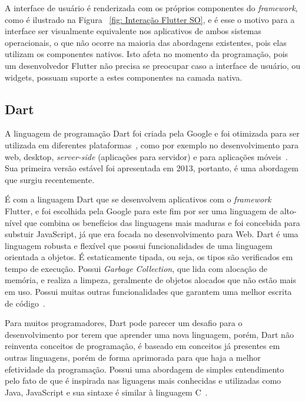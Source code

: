 A interface de usuário é renderizada com os próprios componentes do \textit{framework}, como é ilustrado na Figura ~\ref{fig: Interação Flutter SO}, e é esse o motivo para a interface ser visualmente equivalente nos aplicativos de ambos sistemas operacionais, o que não ocorre na maioria das abordagens existentes, pois elas utilizam os componentes nativos.
Isto afeta no momento da programação, pois um desenvolvedor Flutter não precisa se preocupar caso a interface de usuário, ou widgets, possuam suporte a estes componentes na camada nativa\cite{zammetti2019practical}.

\subsection{Dart}\label{subsec:dart}

A linguagem de programação Dart foi criada pela Google e foi otimizada para ser utilizada em diferentes plataformas~\cite{clow2019flutter}, como por exemplo no desenvolvimento para web, desktop, \textit{server-side} (aplicações para servidor) e para aplicações móveis~\cite{biessek2019dart}.
Sua primeira versão estável foi apresentada em 2013, portanto, é uma abordagem que surgiu recentemente.

É com a linguagem Dart que se desenvolvem aplicativos com o \textit{framework} Flutter, e foi escolhida pela Google para este fim por ser uma linguagem de alto-nível que combina os benefícios das linguagens mais maduras e foi concebida para substuir JavaScript, já que era focada no desenvolvimento para Web.
Dart é uma linguagem robusta e flexível que possui funcionalidades de uma linguagem orientada a objetos.
É estaticamente tipada, ou seja, os tipos são verificados em tempo de execução.
Possui \textit{Garbage Collection}, que lida com alocação de memória, e realiza a limpeza, geralmente de objetos alocados que não estão mais em uso.
Possui muitas outras funcionalidades que garantem uma melhor escrita de código~\cite{biessek2019dart}.

Para muitos programadores, Dart pode parecer um desafio para o desenvolvimento por terem que aprender uma nova linguagem, porém, Dart não reinventa conceitos de programação, é baseado em conceitos já presentes em outras linguagens, porém de forma aprimorada para que haja a melhor efetividade da programação.
Possui uma abordagem de simples entendimento pelo fato de que é inspirada nas liguagens mais conhecidas e utilizadas como Java, JavaScript e sua sintaxe é similar à linguagem C~\cite{clow2019flutter}.

